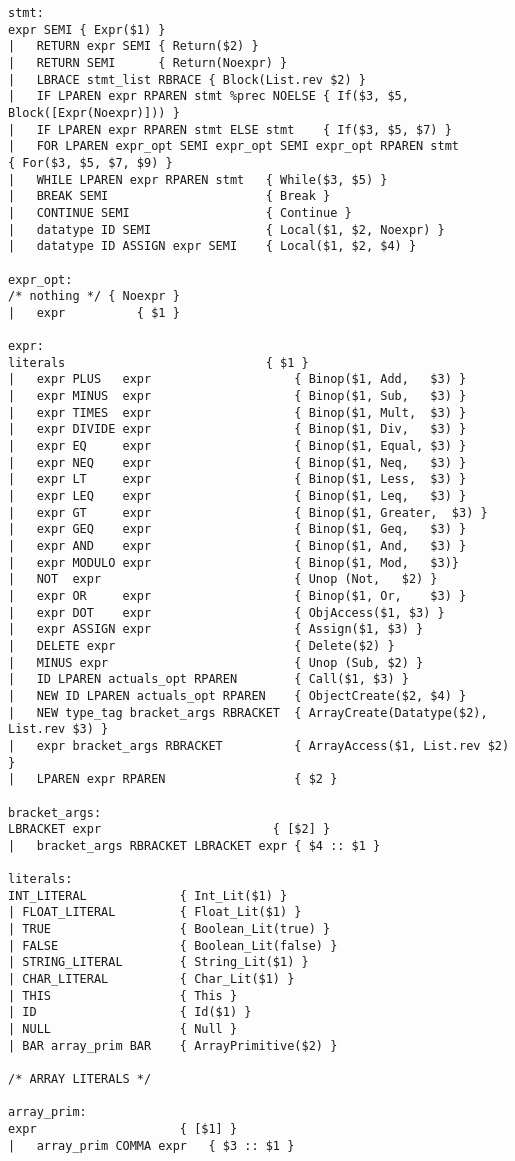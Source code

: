 \begin{verbatim}
stmt:
expr SEMI { Expr($1) }
| 	RETURN expr SEMI { Return($2) }
|	RETURN SEMI		 { Return(Noexpr) }
| 	LBRACE stmt_list RBRACE { Block(List.rev $2) }
| 	IF LPAREN expr RPAREN stmt %prec NOELSE { If($3, $5, Block([Expr(Noexpr)])) }
| 	IF LPAREN expr RPAREN stmt ELSE stmt    { If($3, $5, $7) }
| 	FOR LPAREN expr_opt SEMI expr_opt SEMI expr_opt RPAREN stmt
{ For($3, $5, $7, $9) }
| 	WHILE LPAREN expr RPAREN stmt 	{ While($3, $5) }
|	BREAK SEMI					 	{ Break }
|	CONTINUE SEMI				 	{ Continue }
|   datatype ID SEMI 			 	{ Local($1, $2, Noexpr) }
| 	datatype ID ASSIGN expr SEMI 	{ Local($1, $2, $4) }

expr_opt:
/* nothing */ { Noexpr }
| 	expr          { $1 }

expr:
literals		 					{ $1 }
| 	expr PLUS   expr 					{ Binop($1, Add,   $3) }
| 	expr MINUS  expr 					{ Binop($1, Sub,   $3) }
| 	expr TIMES  expr 					{ Binop($1, Mult,  $3) }
| 	expr DIVIDE expr 					{ Binop($1, Div,   $3) }
| 	expr EQ     expr 					{ Binop($1, Equal, $3) }
| 	expr NEQ    expr 					{ Binop($1, Neq,   $3) }
| 	expr LT     expr 					{ Binop($1, Less,  $3) }
| 	expr LEQ    expr 					{ Binop($1, Leq,   $3) }
| 	expr GT     expr 					{ Binop($1, Greater,  $3) }
| 	expr GEQ    expr 					{ Binop($1, Geq,   $3) }
| 	expr AND    expr 					{ Binop($1, And,   $3) }
| 	expr MODULO expr 					{ Binop($1, Mod,   $3)}
| 	NOT  expr 							{ Unop (Not,   $2) }
| 	expr OR     expr 					{ Binop($1, Or,    $3) }
| 	expr DOT    expr 					{ ObjAccess($1, $3) }
| 	expr ASSIGN expr 					{ Assign($1, $3) }
| 	DELETE expr 						{ Delete($2) }
|   MINUS expr 							{ Unop (Sub, $2) }
| 	ID LPAREN actuals_opt RPAREN 		{ Call($1, $3) }
| 	NEW ID LPAREN actuals_opt RPAREN 	{ ObjectCreate($2, $4) }
|	NEW type_tag bracket_args RBRACKET 	{ ArrayCreate(Datatype($2), List.rev $3) }
| 	expr bracket_args RBRACKET		 	{ ArrayAccess($1, List.rev $2) } 
| 	LPAREN expr RPAREN 					{ $2 }

bracket_args:
LBRACKET expr						 { [$2] }
| 	bracket_args RBRACKET LBRACKET expr { $4 :: $1 }

literals:
INT_LITERAL      		{ Int_Lit($1) }
| FLOAT_LITERAL    		{ Float_Lit($1) }
| TRUE			   		{ Boolean_Lit(true) }
| FALSE			   		{ Boolean_Lit(false) }
| STRING_LITERAL   		{ String_Lit($1) }  
| CHAR_LITERAL			{ Char_Lit($1) }
| THIS 			   		{ This }
| ID 			   		{ Id($1) }	
| NULL				    { Null }
| BAR array_prim BAR 	{ ArrayPrimitive($2) }

/* ARRAY LITERALS */

array_prim:
expr 					{ [$1] }
|	array_prim COMMA expr 	{ $3 :: $1 }

\end{verbatim}	